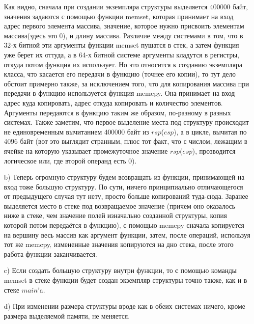 \documentclass[a4paper,12pt]{article}
\begin{document}
Как видно, сначала при создании экземпляра структуры выделяется 400000 байт, значения задаются с помощью функции memset, которая принимает на вход адрес первого элемента массива, значение, которое нужно присвоить элементам массива(здесь это 0), и длину массива. Различие между системами в том, что в 32-х битной эти аргументы функции memset пушатся в стек, а затем функция уже берет их оттуда, а в 64-х битной системе аргументы кладутся в регистры, откуда потом функция их использует. Но это относится к созданию экземпляра класса, что касается его передачи в функцию (точнее его копии), то тут дело обстоит примерно также, за исключением того, что для копирования массива при передачи в функцию используется функция memcpy. Она принимает на вход адрес куда копировать, адрес откуда копировать и количество элементов. Аргументы передаются в функцию таким же образом, по-разному в разных системах. Также заметим, что первое выделение места под структуру происходит не единовременным вычитанием 400000 байт из $rsp$($esp$), а в цикле, вычитая по 4096 байт (вот это выглядит странным, плюс тот факт, что с числом, лежащим в ячейке на которую указывает промежуточное значение $rsp$($esp$), прозводится логическое или, где второй операнд есть 0). 

b) Теперь огромную структуру будем возвращать из функции, принимающей на вход тоже большую структуру. По сути, ничего принципиально отличающегося от предыдущего случая тут нету, просто больше копирований туда-сюда. Заранее выделяется место в стеке под возвращаемое значение (причем оно оказалось ниже в стеке, чем значение полей изначально созданной структуры, копия которой потом передаётся в функцию), с помощью memcpy сначала копируется на вершину весь массив как аргумент функции, затем, после операций, используя тот же memcpy, измененные значения копируются на дно стека, после этого работа функции заканчивается.

c) Если создать большую структуру внутри функции, то с помощью команды memset в стеке функции будет создан экземпляр структуры точно также, как и в стеке $main$'a.

d) При изменении размера структуры вроде как в обеих системах ничего, кроме размера выделяемой памяти, не меняется.
\end{document}
